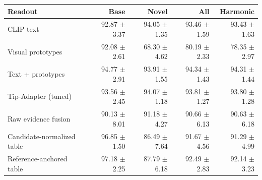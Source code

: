 \begin{tabular}{lrrrr}
\toprule
Readout & Base & Novel & All & Harmonic \\
\midrule
CLIP text & 92.87 $\pm$ 3.37 & 94.05 $\pm$ 1.35 & 93.46 $\pm$ 1.59 & 93.43 $\pm$ 1.63 \\
Visual prototypes & 92.08 $\pm$ 2.61 & 68.30 $\pm$ 4.62 & 80.19 $\pm$ 2.33 & 78.35 $\pm$ 2.97 \\
Text + prototypes & 94.77 $\pm$ 2.91 & 93.91 $\pm$ 1.55 & 94.34 $\pm$ 1.43 & 94.31 $\pm$ 1.44 \\
Tip-Adapter (tuned) & 93.56 $\pm$ 2.45 & 94.07 $\pm$ 1.18 & 93.81 $\pm$ 1.27 & 93.80 $\pm$ 1.28 \\
Raw evidence fusion & 90.13 $\pm$ 8.01 & 91.18 $\pm$ 4.27 & 90.66 $\pm$ 6.13 & 90.63 $\pm$ 6.18 \\
Candidate-normalized table & 96.85 $\pm$ 1.50 & 86.49 $\pm$ 7.64 & 91.67 $\pm$ 4.56 & 91.29 $\pm$ 4.99 \\
Reference-anchored table & 97.18 $\pm$ 2.25 & 87.79 $\pm$ 6.18 & 92.49 $\pm$ 2.83 & 92.14 $\pm$ 3.23 \\
\bottomrule
\end{tabular}